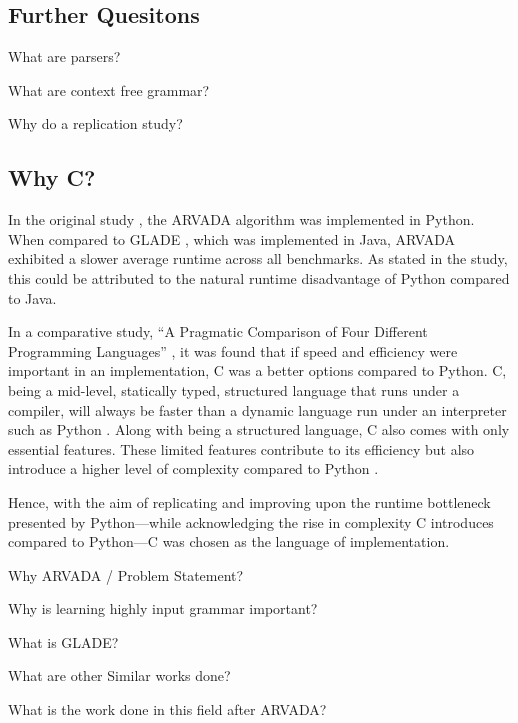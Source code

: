 \subsection{Further Quesitons}

What are parsers?

What are context free grammar?

Why do a replication study?

\subsection{Why C?}

In the original study \cite{kulkarniLearningHighlyRecursive2021}, the ARVADA algorithm was implemented in Python. When compared to GLADE \cite{bastaniSynthesizingProgramInput}, which was implemented in Java, ARVADA exhibited a slower average runtime across all benchmarks. As stated in the study, this could be attributed to the natural runtime disadvantage of Python compared to Java.

\vspace{\baselineskip}
In a comparative study, \enquote{A Pragmatic Comparison of Four Different Programming Languages} \cite{aliPragmaticComparisonFour2021}, it was found that if speed and efficiency were important in an implementation, C was a better options compared to Python. C, being a mid-level, statically typed, structured language that runs under a compiler, will always be faster than a dynamic language run under an interpreter such as Python \cite{kumarPythonLanguageComparison2022}. Along with being a structured language, C also comes with only essential features. These limited features contribute to its efficiency but also introduce a higher level of complexity compared to Python \cite{aliPragmaticComparisonFour2021}\cite{kumarPythonLanguageComparison2022}.

\vspace{\baselineskip}
Hence, with the aim of replicating and improving upon the runtime bottleneck presented by Python—while acknowledging the rise in complexity C introduces compared to Python—C was chosen as the language of implementation.

Why ARVADA / Problem Statement?

Why is learning highly input grammar important?

What is GLADE?

What are other Similar works done?

What is the work done in this field after ARVADA?




